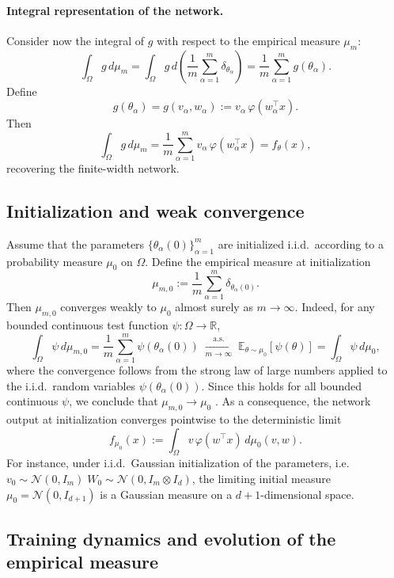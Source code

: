 \paragraph{Integral representation of the network.}
Consider now the integral of $g$ with respect to the empirical measure $\mu_m$:
\[
	\int_\Omega g\,d\mu_m
	=
	\int_\Omega g\,d\left(\frac{1}{m}\sum_{\alpha=1}^m \delta_{\theta_\alpha}\right)
	=
	\frac{1}{m}\sum_{\alpha=1}^m g(\theta_\alpha).
\]
Define
\[
	g(\theta_\alpha) = g(v_\alpha,w_\alpha) := v_\alpha\,\varphi(w_\alpha^\top x).
\]
Then
\begin{equation}
	\int_\Omega g\,d\mu_m
	=
	\frac{1}{m}\sum_{\alpha=1}^m v_\alpha\,\varphi(w_\alpha^\top x)
	=
	f_\theta(x),
	\label{eq:app-mf-integral-form}
\end{equation}
recovering the finite-width network.

\subsection{\label{app:mf-weak-convergence}Initialization and weak convergence}

Assume that the parameters $\{\theta_\alpha(0)\}_{\alpha=1}^m$ are initialized
i.i.d.\ according to a probability measure $\mu_0$ on $\Omega$.
Define the empirical measure at initialization
\[
	\mu_{m,0}
	:=
	\frac1m\sum_{\alpha=1}^m \delta_{\theta_\alpha(0)} .
\]
Then $\mu_{m,0}$ converges weakly to $\mu_0$ almost surely as $m\to\infty$.
Indeed, for any bounded continuous test function $\psi:\Omega\to\mathbb R$,
\[
	\int_\Omega \psi\,d\mu_{m,0}
	=
	\frac1m\sum_{\alpha=1}^m \psi(\theta_\alpha(0))
	\;\xrightarrow[m \to \infty]{\text{a.s.}}\;
	\mathbb E_{\theta\sim\mu_0}[\psi(\theta)]
	=
	\int_\Omega \psi\,d\mu_0,
\]
where the convergence follows from the strong law of large numbers applied to
the i.i.d.\ random variables $\psi(\theta_\alpha(0))$.
Since this holds for all bounded continuous $\psi$, we conclude that
$\mu_{m,0} \to \mu_0$ \citep{vadaranjan1958convergenceofprobabilitydistribution}.
As a consequence, the network output at initialization converges pointwise to
the deterministic limit
\[
	f_{\mu_0}(x)
	:=
	\int_\Omega v\,\varphi(w^\top x)\,d\mu_0(v,w).
\]
For instance, under i.i.d.\ Gaussian initialization of the parameters, i.e.
$v_0 \sim \mathcal{N}(0,I_m)\; W_0 \sim \mathcal{N}(0, I_m \otimes I_d)$, the
limiting initial measure $\mu_0 = \mathcal{N}(0, I_{d+1})$ is a Gaussian
measure on a $d+1$-dimensional space.

\subsection{\label{app:mf-particle-dynamics}Training dynamics and evolution of the empirical measure}

